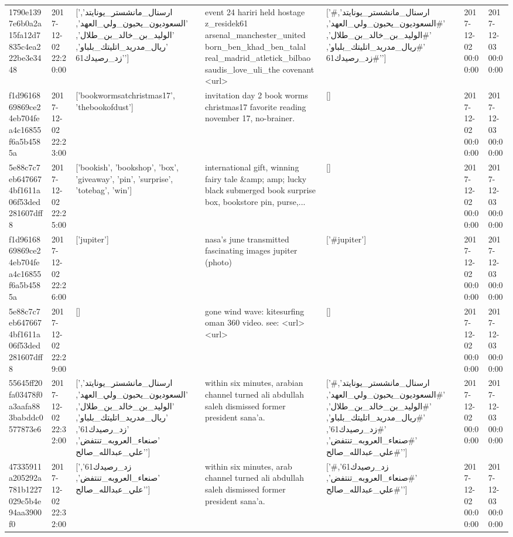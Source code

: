 \begin{tabular}{lllllll}
1790e1397e6b0a2a15fa12d7835c4ea222be3e3448 & 2017-12-02 22:20:00 & ['ارسنال_مانشستر_يونايتد', 'السعوديون_يحبون_ولي_العهد', 'الوليد_بن_خالد_بن_طلال', 'ريال_مدريد_اتليتك_بلباو', 'زد_رصيدك61'] & event 24 hariri held hostage z\_residek61 arsenal\_manchester\_united born\_ben\_khad\_ben\_talal real\_madrid\_atletick\_bilbao saudis\_love\_uli\_the covenant <url> & ['#ارسنال_مانشستر_يونايتد', '#السعوديون_يحبون_ولي_العهد', '#الوليد_بن_خالد_بن_طلال', '#ريال_مدريد_اتليتك_بلباو', '#زد_رصيدك61'] & 2017-12-02 00:00:00 & 2017-12-03 00:00:00 \\
f1d9616869869ce24eb704fea4c16855f6a5b4585a & 2017-12-02 22:23:00 & ['bookwormsatchristmas17', 'thebookofdust'] & invitation day 2 book worms christmas17 favorite reading november 17, no-brainer. & [] & 2017-12-02 00:00:00 & 2017-12-03 00:00:00 \\
5e88c7c7eb6476674bf1611a06f53ded281607dff8 & 2017-12-02 22:25:00 & ['bookish', 'bookshop', 'box', 'giveaway', 'pin', 'surprise', 'totebag', 'win'] & international gift, winning fairy tale \&amp; amp; lucky black submerged book surprise box, bookstore pin, purse,... & [] & 2017-12-02 00:00:00 & 2017-12-03 00:00:00 \\
f1d9616869869ce24eb704fea4c16855f6a5b4585a & 2017-12-02 22:26:00 & ['jupiter'] & nasa's june transmitted fascinating images jupiter (photo) & ['#jupiter'] & 2017-12-02 00:00:00 & 2017-12-03 00:00:00 \\
5e88c7c7eb6476674bf1611a06f53ded281607dff8 & 2017-12-02 22:29:00 & [] & gone wind wave: kitesurfing oman 360 video. see: <url> <url> & [] & 2017-12-02 00:00:00 & 2017-12-03 00:00:00 \\
55645ff20fa03478f0a3aafa883babddc0577873e6 & 2017-12-02 22:32:00 & ['ارسنال_مانشستر_يونايتد', 'السعوديون_يحبون_ولي_العهد', 'الوليد_بن_خالد_بن_طلال', 'ريال_مدريد_اتليتك_بلباو', 'زد_رصيدك61', 'صنعاء_العروبه_تنتفض', 'علي_عبدالله_صالح'] & within six minutes, arabian channel turned ali abdullah saleh dismissed former president sana'a. & ['#ارسنال_مانشستر_يونايتد', '#السعوديون_يحبون_ولي_العهد', '#الوليد_بن_خالد_بن_طلال', '#ريال_مدريد_اتليتك_بلباو', '#زد_رصيدك61', '#صنعاء_العروبه_تنتفض', '#علي_عبدالله_صالح'] & 2017-12-02 00:00:00 & 2017-12-03 00:00:00 \\
47335911a205292a781b1227029c5b4e94aa3900f0 & 2017-12-02 22:32:00 & ['زد_رصيدك61', 'صنعاء_العروبه_تنتفض', 'علي_عبدالله_صالح'] & within six minutes, arab channel turned ali abdullah saleh dismissed former president sana'a. & ['#زد_رصيدك61', '#صنعاء_العروبه_تنتفض', '#علي_عبدالله_صالح'] & 2017-12-02 00:00:00 & 2017-12-03 00:00:00 \\

\end{tabular}
